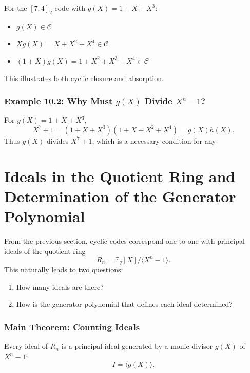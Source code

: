 \documentclass[11pt,oneside]{book}
\providecommand{\tightlist}{\setlength{\itemsep}{0pt}\setlength{\parskip}{0pt}}
\theoremstyle{plain}
\theoremstyle{definition}
\theoremstyle{remark}
\begin{document}
For the \([7,4]_2\) code with \(g(X)=1+X+X^3\):

\begin{itemize}
\tightlist
\item
  \(g(X)\in\mathcal{C}\)
\item
  \(Xg(X)=X+X^2+X^4\in\mathcal{C}\)
\item
  \((1+X)g(X)=1+X^2+X^3+X^4\in\mathcal{C}\)
\end{itemize}

This illustrates both cyclic closure and absorption.

\subsubsection{\texorpdfstring{Example 10.2: Why Must \(g(X)\) Divide
\(X^n-1\)?}{Example 10.2: Why Must g(X) Divide X\^{}n-1?}}\label{example-10.2-why-must-gx-divide-xn-1}

For \(g(X)=1+X+X^3\), \[X^7+1 = (1+X+X^3)(1+X+X^2+X^4)=g(X)h(X).\] Thus
\(g(X)\) divides \(X^7+1\), which is a necessary condition for any

\section{Ideals in the Quotient Ring and Determination of the Generator Polynomial}\label{sec:ideals-and-generator-polynomials}

From the previous section, cyclic codes correspond one-to-one with
principal ideals of the quotient ring
\[R_n = \mathbb{F}_q[X]/\langle X^n-1 \rangle.\] This naturally leads to
two questions:

\begin{enumerate}
\def\labelenumi{\arabic{enumi}.}
\tightlist
\item
  How many ideals are there?
\item
  How is the generator polynomial that defines each ideal determined?
\end{enumerate}

\subsubsection{Main Theorem: Counting
Ideals}\label{main-theorem-counting-ideals}

Every ideal of \(R_n\) is a principal ideal generated by a monic divisor
\(g(X)\) of \(X^n-1\): \[I = \langle g(X) \rangle.\]
\end{document}
